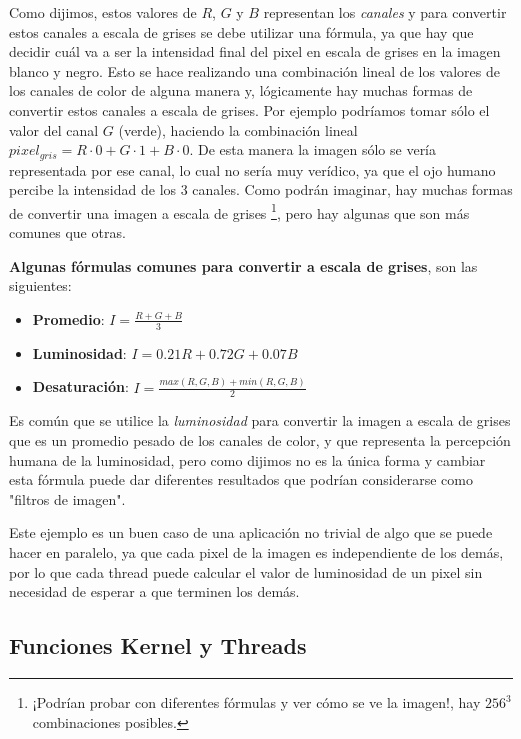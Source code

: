 Como dijimos, estos valores de $R$, $G$ y $B$ representan los \textit{canales} y para convertir estos canales a escala
de grises se debe utilizar una fórmula, ya que hay que decidir cuál va a ser la intensidad final del pixel en escala de
grises en la imagen blanco y negro. Esto se hace realizando una combinación lineal de los valores de los canales de
color de alguna manera y, lógicamente hay muchas formas de convertir estos canales a escala de grises. Por ejemplo
podríamos tomar sólo el valor del canal $G$ (verde), haciendo la combinación lineal $pixel_{gris} = R \cdot 0 + G \cdot
1 + B \cdot 0$. De esta manera la imagen sólo se vería representada por ese canal, lo cual no sería muy verídico,
ya que el ojo humano percibe la intensidad de los 3 canales. Como podrán imaginar, hay muchas formas de convertir una
imagen a escala de grises \footnote{¡Podrían probar con diferentes fórmulas y ver cómo se ve la imagen!, hay $256^3$
combinaciones posibles.}, pero hay algunas que son más comunes que otras.

\begin{tcolorbox}[colback=mint,colframe=yellow!75!black,arc=0pt,outer arc=0pt]
  \textbf{Algunas fórmulas comunes para convertir a escala de grises}, son las siguientes: \\

  \begin{itemize}
    \item \textbf{Promedio}: $I = \frac{R + G + B}{3}$
    \item \textbf{Luminosidad}: $I = 0.21R + 0.72G + 0.07B$
    \item \textbf{Desaturación}: $I = \frac{max(R, G, B) + min(R, G, B)}{2}$
  \end{itemize}
\end{tcolorbox}

Es común que se utilice la \textit{luminosidad} para convertir la imagen a escala de grises que es un promedio pesado de
los canales de color, y que representa la percepción humana de la luminosidad, pero como dijimos no es la única forma y
cambiar esta fórmula puede dar diferentes resultados que podrían considerarse como "filtros de imagen".

Este ejemplo es un buen caso de una aplicación no trivial de algo que se puede hacer en paralelo, ya que cada pixel de
la imagen es independiente de los demás, por lo que cada thread puede calcular el valor de luminosidad de un pixel sin
necesidad de esperar a que terminen los demás.

\subsection{Funciones Kernel y Threads}

